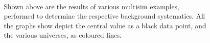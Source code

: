 \begin{figure}[htbp]
\begin{center}
{            \label{fig:xsecsys_tunedG3_uboone}
        } \\
        \caption[Multisim Results of Six Systematic Uncertainties]{Shown above are the results of various multisim examples, performed to determine the respective background systematics. All the graphs show depict the central value as a black data point, and the various universes, as coloured lines.} 
        \label{fig:SystematicUncertainties}
	\end{center}
\end{figure}


